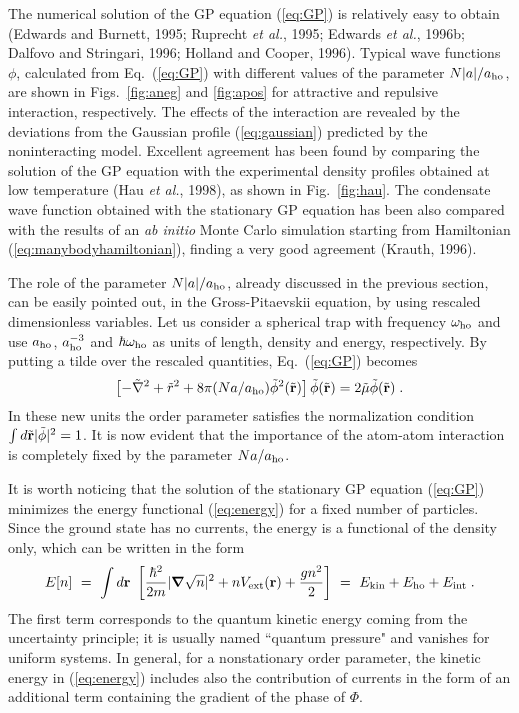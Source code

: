 The numerical solution of the GP equation (\ref{eq:GP}) is relatively
easy to obtain (Edwards and Burnett, 1995; Ruprecht {\it et al.}, 1995;
Edwards {\it et al.}, 1996b; Dalfovo and Stringari, 1996; Holland and
Cooper, 1996). Typical wave functions $\phi$, calculated 
from Eq.~(\ref{eq:GP}) with different values of the  parameter
$N |a| /a_{\rm ho}$, are shown in Figs.~\ref{fig:aneg} and \ref{fig:apos}
for attractive and repulsive interaction, respectively. The effects
of the interaction are revealed by the deviations from the Gaussian 
profile (\ref{eq:gaussian}) predicted by the noninteracting model. 
Excellent agreement has been found by comparing the solution of the 
GP equation with the experimental density profiles obtained at low 
temperature (Hau {\it et al.}, 1998), as shown in Fig.~\ref{fig:hau}.
The condensate wave function obtained with the stationary GP equation
has been also compared with the results of an {\it ab initio} Monte Carlo
simulation starting from Hamiltonian (\ref{eq:manybodyhamiltonian}),
finding a very good agreement (Krauth, 1996).  

The role of the parameter $N |a| /a_{\rm ho}$, already
discussed in the previous section, can be easily pointed out, in the
Gross-Pitaevskii equation, by using rescaled dimensionless variables.
Let us consider a spherical trap with frequency $\omega_{\rm ho}$
and use $a_{\rm ho}$,  $a_{\rm ho}^{-3}$ and $\hbar\omega_{\rm ho}$ as 
units of length,  density and energy, respectively. By putting a tilde
over the rescaled quantities, Eq.~(\ref{eq:GP}) becomes
\begin{equation}
\left[ - \tilde \nabla^2 + \tilde r^2 
+ 8 \pi ( N a/ a_{\rm ho})  \tilde \phi^2(\tilde{\bf r})
\right]  \tilde \phi(\tilde{\bf r}) = 2 \tilde \mu
\tilde \phi(\tilde{\bf r}) \;.
\label{eq:dimensionlessGP}
\end{equation}
In these new units the order parameter satisfies the normalization
condition $\int d\tilde{\bf r} |\tilde\phi|^2=1$.
It is now evident that the importance of the atom-atom interaction
is completely fixed by the parameter $N a /a_{\rm ho}$. 

It is worth noticing that the solution of the stationary GP equation 
(\ref{eq:GP}) minimizes the energy functional (\ref{eq:energy}) for 
a fixed number of particles. Since the ground state has no currents, 
the energy is a functional of the density only, which can be written
in the form
\begin{equation}
E[n] \  = \  \int d{\bf r} \  \left[ {\hbar^2 \over 2m}
| \mbox{\boldmath$\nabla$} \sqrt{n} |^2
+  n V_{\rm ext}({\bf r})  + { g n^2 \over 2} \right]  
\  = \  E_{\rm kin} + E_{\rm ho} + E_{\rm int}  \; .
\label{eq:funcofdensity}
\end{equation}  
The first term corresponds to the quantum kinetic energy coming from 
the uncertainty principle; it is usually named ``quantum pressure" and 
vanishes for uniform systems.  In general, for a nonstationary order 
parameter, the kinetic energy in  (\ref{eq:energy}) includes also 
the contribution of currents in the form of an additional term 
containing  the gradient of the phase of $\Phi$. 

